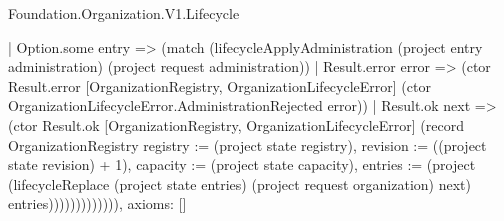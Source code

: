 \begin{lexlean}{Foundation.Organization.V1.Lifecycle}
\begin{semanticmodule}
{                    | Option.some entry => (match (lifecycleApplyAdministration (project entry administration) (project request administration))
                      | Result.error error => (ctor Result.error [OrganizationRegistry, OrganizationLifecycleError] (ctor OrganizationLifecycleError.AdministrationRejected error))
                      | Result.ok next => (ctor Result.ok [OrganizationRegistry, OrganizationLifecycleError] (record OrganizationRegistry {registry := (project state registry), revision := ((project state revision) + 1), capacity := (project state capacity), entries := (project (lifecycleReplace (project state entries) (project request organization) next) entries)})))))))))))),
  axioms: []
}
\end{semanticmodule}
\end{lexlean}

